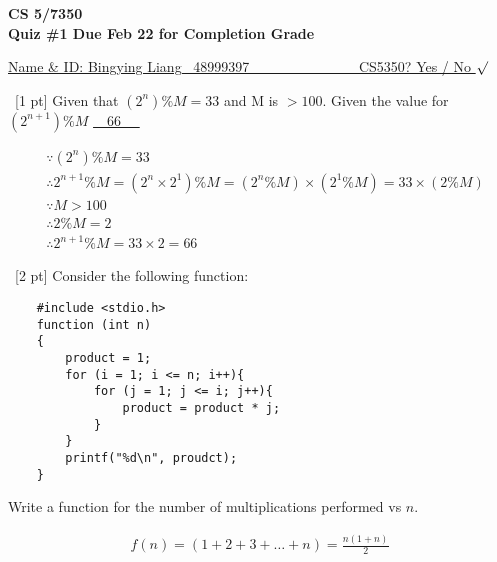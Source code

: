\documentclass[12pt]{article}
\newenvironment{sol}[1][Solution]{\begin{trivlist}\item[\hskip\labelsep {\bfseries #1:}]}{\end{trivlist}}
\begin{document}
\renewcommand{\qedsymbol}{\filledbox}
\begin{center}
    \textbf{CS 5/7350} \\
    \textbf{Quiz \#1 Due Feb 22 for Completion Grade}
\end{center}
\begin{flushright}
\underline{Name \& ID: Bingying Liang \ 
48999397 \ \ \ \ \ \ \ \ \ \ \ \ \ \ \ CS5350? Yes / No $\surd$}
\end{flushright}

\begin{enumerate}
    \item \ [1 pt] Given that $(2^n) \% M = 33 $ and M is $> 100$. Given the value for $(2^{n+1})\% M $ \underline{\ \ 66 \ \ }
    \begin{sol}
        \begin{align*}
        & \because (2^{n}) \% M = 33 \\
        & \therefore 2^{n + 1} \% M =  (2^n \times 2^1) \% M = (2^n \% M) \times (2^1 \% M) = 33 \times (2 \% M)\\
        & \because M > 100 \\
        & \therefore 2 \% M = 2 \\
        & \therefore 2^{n+1} \% M = 33 \times 2 = 66
        \end{align*}
    \end{sol}

    \item \ [2 pt] Consider the following function:
    \begin{verbatim}
    #include <stdio.h>
    function (int n)
    {
        product = 1;
        for (i = 1; i <= n; i++){
            for (j = 1; j <= i; j++){
                product = product * j;
            }
        }
        printf("%d\n", proudct);
    }
\end{verbatim}
    \begin{enumerate}
        \item Write a function for the number of multiplications performed vs $n$.
        \begin{sol}
        \begin{align*}
            f(n) = (1 + 2 + 3 + \dots + n)  =  \frac{n(1+n)}{2} 
        \end{align*}
        \end{sol}
        

\end{enumerate}
\end{enumerate}
\end{document}
